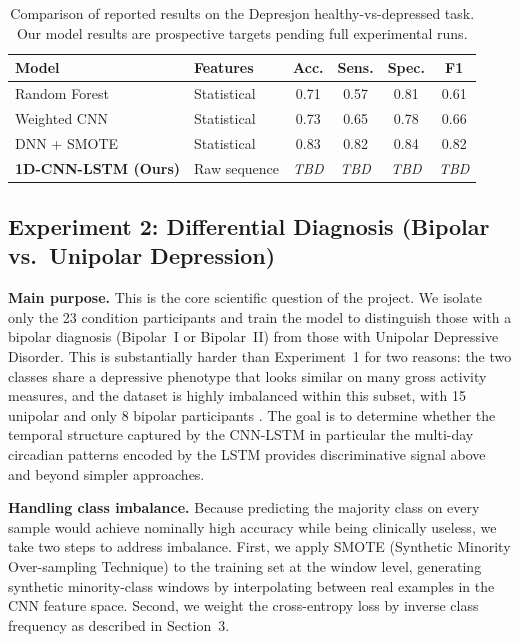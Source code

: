 \begin{table}[h]
\centering
\caption{Comparison of reported results on the Depresjon healthy-vs-depressed task. Our model results are prospective targets pending full experimental runs.}
\label{tab:baseline}
\begin{tabular}{llcccc}
\hline
\textbf{Model} & \textbf{Features} & \textbf{Acc.} & \textbf{Sens.} & \textbf{Spec.} & \textbf{F1} \\
\hline
Random Forest \cite{jakobsen2020applying}  & Statistical & 0.71 & 0.57 & 0.81 & 0.61 \\
Weighted CNN \cite{jakobsen2020applying}   & Statistical & 0.73 & 0.65 & 0.78 & 0.66 \\
DNN + SMOTE \cite{jakobsen2020applying}    & Statistical & 0.83 & 0.82 & 0.84 & 0.82 \\
\textbf{1D-CNN-LSTM (Ours)}               & Raw sequence & \textit{TBD} & \textit{TBD} & \textit{TBD} & \textit{TBD} \\
\hline
\end{tabular}
\end{table}

\subsection{Experiment 2: Differential Diagnosis (Bipolar vs.\ Unipolar Depression)}

\textbf{Main purpose.}
This is the core scientific question of the project. We isolate only the 23 condition participants and train the model to distinguish those with a bipolar diagnosis (Bipolar~I or Bipolar~II) from those with Unipolar Depressive Disorder. This is substantially harder than Experiment~1 for two reasons: the two classes share a depressive phenotype that looks similar on many gross activity measures, and the dataset is highly imbalanced within this subset, with 15 unipolar and only 8 bipolar participants \cite{jakobsen2020applying}. The goal is to determine whether the temporal structure captured by the CNN-LSTM in particular the multi-day circadian patterns encoded by the LSTM provides discriminative signal above and beyond simpler approaches.

\textbf{Handling class imbalance.}
Because predicting the majority class on every sample would achieve nominally high accuracy while being clinically useless, we take two steps to address imbalance. First, we apply SMOTE (Synthetic Minority Over-sampling Technique) to the training set at the window level, generating synthetic minority-class windows by interpolating between real examples in the CNN feature space. Second, we weight the cross-entropy loss by inverse class frequency as described in Section~3.

